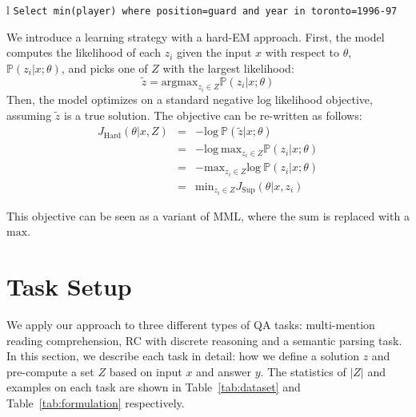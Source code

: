 \documentclass[11pt,a4paper]{article}
\begin{document}
\begin{table*}[tb]
\begin{tabulary}{\textwidth}{l}
        \texttt{Select min(player) where position=guard and year in toronto=1996-97} \\
     \bottomrule
\end{tabulary}
\caption{
    Examples of the input, answer text ($y$), $f$, $Z_\text{tot}$ and $Z$. First, in multi-mention reading comprehension, the answer text `Robert Schumann' is mentioned six times but only the fourth span is related to the question. Second, in reading comprehension with discrete reasoning, many equations yield to the answer 4, but only `40-37' answers the question. Lastly, in SQL query generation, five SQL queries lead to the answer but only the first one is the correct query.
See Section~\ref{sec:setup} for more details.
} 
\label{tab:formulation}
\vspace{-8pt}
\end{table*}


 
We introduce a learning strategy with a hard-EM approach. First, the model computes the likelihood of each $z_i$ given the input $x$ with respect to $\theta{}$, $\mathbb{P}(z_i | x; \theta{})$, and picks one of $Z$ with the largest likelihood:
\begin{equation*}
    \tilde{z} = \mathrm{argmax}_{z_i \in Z} \mathbb{P} (z_i | x; \theta{})
\end{equation*}
Then, the model optimizes on a standard negative log likelihood objective, assuming $\tilde{z}$ is a true solution. The objective can be re-written as follows:
\begin{eqnarray*}
    J_{\text{Hard}}(\theta{}|x, Z)
    &=& - \mathrm{log}~\mathbb{P}(\tilde{z} | x; \theta{}) \\
    &=& - \mathrm{log}~\mathrm{max}_{z_i \in Z}  \mathbb{P}(z_i | x; \theta{}) \\
    &=& - \mathrm{max}_{z_i \in Z} \mathrm{log} ~\mathbb{P}(z_i | x; \theta{}) \\
    &=& \mathrm{min}_{z_i \in Z} J_{\text{Sup}}(\theta{}|x, z_i)
\end{eqnarray*}

\noindent
This objective can be seen as a variant of MML, where the $\mathrm{sum}$ is replaced with a $\mathrm{max}$.

 \section{Task Setup}\label{sec:setup}
We apply our approach to three different types of QA tasks: multi-mention reading comprehension, RC with discrete reasoning and a semantic parsing task. In this section, we describe each task in detail: how we define a solution $z$ and pre-compute a set $Z$ based on input $x$ and answer $y$. The statistics of $|Z|$ and examples on each task are shown in Table~\ref{tab:dataset} and Table~\ref{tab:formulation} respectively.
\end{document}
